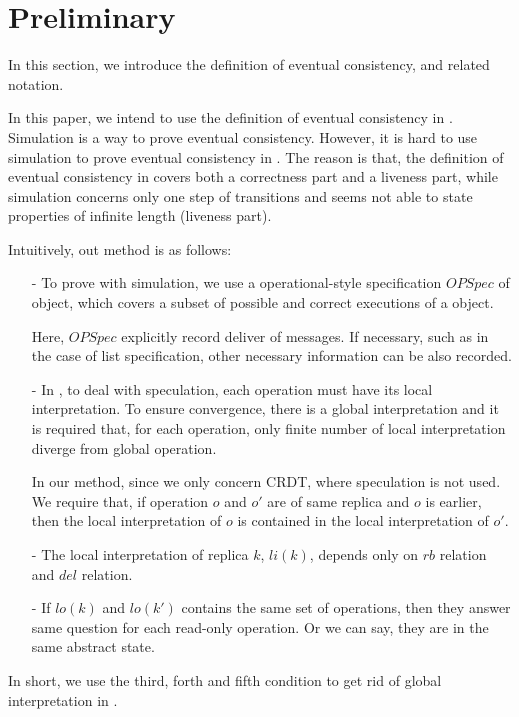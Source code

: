 
\section{Preliminary}
\label{sec:preliminary} 

In this section, we introduce the definition of eventual consistency, and related notation. 

 

In this paper, we intend to use the definition of eventual consistency in \cite{Bouajjani:2014}. Simulation is a way to prove eventual consistency. However, it is hard to use simulation to prove eventual consistency in \cite{Bouajjani:2014}. The reason is that, the definition of eventual consistency in \cite{Bouajjani:2014} covers both a correctness part and a liveness part, while simulation concerns only one step of transitions and seems not able to state properties of infinite length (liveness part).

Intuitively, out method is as follows:

\begin{itemize}
\setlength{\itemsep}{0.5pt}
\item[-] To prove with simulation, we use a operational-style specification $\textit{OPSpec}$ of object, which covers a subset of possible and correct executions of a object.

Here, $\textit{OPSpec}$ explicitly record deliver of messages. If necessary, such as in the case of list specification, other necessary information can be also recorded.

\item[-] In \cite{Bouajjani:2014}, to deal with speculation, each operation must have its local interpretation. To ensure convergence, there is a global interpretation and it is required that, for each operation, only finite number of local interpretation diverge from global operation.

    In our method, since we only concern CRDT, where speculation is not used. We require that, if operation $o$ and $o'$ are of same replica and $o$ is earlier, then the local interpretation of $o$ is contained in the local interpretation of $o'$.

\item[-] The local interpretation of replica $k$, $li(k)$, depends only on $rb$ relation and $del$ relation.

\item[-] If $lo(k)$ and $lo(k')$ contains the same set of operations, then they answer same question for each read-only operation. Or we can say, they are in the same abstract state.
\end{itemize}

In short, we use the third, forth and fifth condition to get rid of global interpretation in \cite{Bouajjani:2014}.



